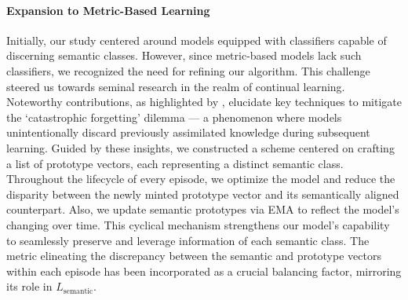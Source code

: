 \documentclass[letterpaper]{article} %
\newcommand{\jh}[1]{\textcolor{black}{#1}}
\begin{document}
\paragraph{Expansion to Metric-Based Learning} 
Initially, our study centered around models
equipped with classifiers capable of %
discerning semantic classes. However, since metric-based models lack such classifiers, we recognized the need for refining our algorithm. 
This challenge steered us towards seminal research in the realm of continual learning. Noteworthy contributions, as highlighted by \cite{continual:catastrophic,catastrophygunbon,continual:memoryrehearsal}, elucidate key techniques to mitigate the `catastrophic forgetting' dilemma — a phenomenon where models unintentionally discard previously assimilated knowledge during subsequent learning.
Guided by these insights, we constructed a scheme centered on crafting a list of prototype vectors, each representing %
a distinct semantic class. Throughout the lifecycle of every episode, we optimize the model and reduce the disparity between the newly minted prototype vector and its semantically aligned counterpart. Also, we update semantic prototypes via EMA to reflect the model's changing over time. This cyclical mechanism strengthens our model's capability to seamlessly preserve and leverage information of each semantic class. The metric elineating the discrepancy between the semantic and prototype vectors within each episode has been incorporated as a crucial balancing factor, mirroring its role in $L_\text{semantic}$.



\end{document}
